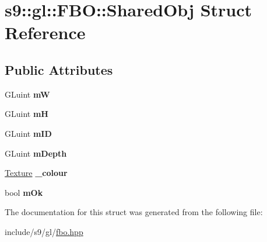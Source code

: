 \hypertarget{structs9_1_1gl_1_1FBO_1_1SharedObj}{\section{s9\-:\-:gl\-:\-:\-F\-B\-O\-:\-:\-Shared\-Obj \-Struct \-Reference}
\label{structs9_1_1gl_1_1FBO_1_1SharedObj}
}
\subsection*{\-Public \-Attributes}
\begin{DoxyCompactItemize}
\item 
\hypertarget{structs9_1_1gl_1_1FBO_1_1SharedObj_a1769db4f71c3aabfebc3d272143dc27c}{\-G\-Luint {\bfseries m\-W}}\label{structs9_1_1gl_1_1FBO_1_1SharedObj_a1769db4f71c3aabfebc3d272143dc27c}

\item 
\hypertarget{structs9_1_1gl_1_1FBO_1_1SharedObj_a7e37881e9449deac72414da64b9482d5}{\-G\-Luint {\bfseries m\-H}}\label{structs9_1_1gl_1_1FBO_1_1SharedObj_a7e37881e9449deac72414da64b9482d5}

\item 
\hypertarget{structs9_1_1gl_1_1FBO_1_1SharedObj_aed218d736734e682410d189841843bbc}{\-G\-Luint {\bfseries m\-I\-D}}\label{structs9_1_1gl_1_1FBO_1_1SharedObj_aed218d736734e682410d189841843bbc}

\item 
\hypertarget{structs9_1_1gl_1_1FBO_1_1SharedObj_a8f81f21a29c6364e54a7aa3f29a2e8b9}{\-G\-Luint {\bfseries m\-Depth}}\label{structs9_1_1gl_1_1FBO_1_1SharedObj_a8f81f21a29c6364e54a7aa3f29a2e8b9}

\item 
\hypertarget{structs9_1_1gl_1_1FBO_1_1SharedObj_a6c95f7df608290573e56d7378ac98943}{\hyperlink{classs9_1_1gl_1_1Texture}{\-Texture} {\bfseries \-\_\-colour}}\label{structs9_1_1gl_1_1FBO_1_1SharedObj_a6c95f7df608290573e56d7378ac98943}

\item 
\hypertarget{structs9_1_1gl_1_1FBO_1_1SharedObj_a1efa7049eb9b8f72cefd4980ad5c1535}{bool {\bfseries m\-Ok}}\label{structs9_1_1gl_1_1FBO_1_1SharedObj_a1efa7049eb9b8f72cefd4980ad5c1535}

\end{DoxyCompactItemize}


\-The documentation for this struct was generated from the following file\-:\begin{DoxyCompactItemize}
\item 
include/s9/gl/\hyperlink{fbo_8hpp}{fbo.\-hpp}\end{DoxyCompactItemize}
